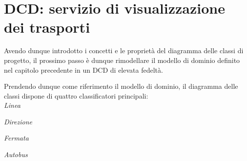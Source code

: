 
\section{DCD: servizio di visualizzazione dei trasporti} %
\label{sec:dcd_servizio_di_visualizzazione_dei_trasporti}

Avendo dunque introdotto i concetti e le proprietà del diagramma delle classi di progetto, il prossimo passo è dunque rimodellare il modello di dominio definito nel capitolo precedente in un DCD di elevata fedeltà.

Prendendo dunque come riferimento il modello di dominio, il diagramma delle classi dispone di quattro classificatori principali:\\

{\itshape Linea}

{\itshape Direzione}

{\itshape Fermata}

{\itshape Autobus}\\

